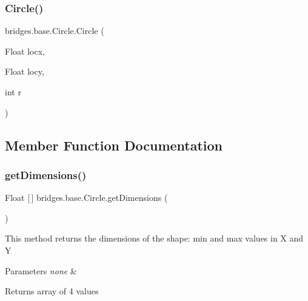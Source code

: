 \mbox{\label{classbridges_1_1base_1_1_circle_a5c7d699257b3e67ac7a3c52e9f05b376}} 
\subsubsection{\texorpdfstring{Circle()}{Circle()}\hspace{0.1cm}{\footnotesize\ttfamily [3/3]}}
{\footnotesize\ttfamily bridges.\+base.\+Circle.\+Circle (\begin{DoxyParamCaption}\item[{Float}]{locx,  }\item[{Float}]{locy,  }\item[{int}]{r }\end{DoxyParamCaption})}



\subsection{Member Function Documentation}
\mbox{\label{classbridges_1_1base_1_1_circle_af16fe10d1dc5bbac325284f91e66b42a}} 
\subsubsection{\texorpdfstring{getDimensions()}{getDimensions()}}
{\footnotesize\ttfamily Float \mbox{[}$\,$\mbox{]} bridges.\+base.\+Circle.\+get\+Dimensions (\begin{DoxyParamCaption}{ }\end{DoxyParamCaption})}

This method returns the dimensions of the shape\+: min and max values in X and Y


\begin{DoxyParams}{Parameters}
{\em none} & \\
\hline
\end{DoxyParams}
\begin{DoxyReturn}{Returns}
array of 4 values 
\end{DoxyReturn}
\mbox{\label{classbridges_1_1base_1_1_circle_ad6a8b8e2dca562fd3fa5254ee861ed70}} 
